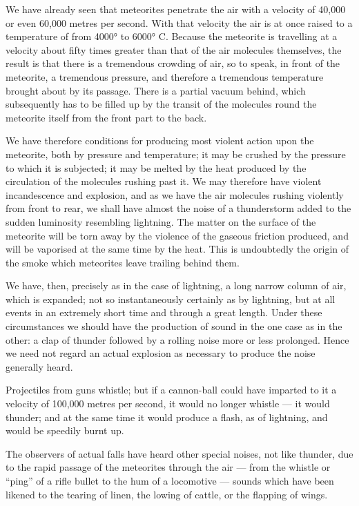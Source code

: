 \documentclass[a4paper, 12pt, oneside, polutonikogreek, english]{article}
\begin{document}
We have already seen that meteorites penetrate the air with a velocity of 40,000 or even 60,000 metres per second. With that velocity the air is at once raised to a temperature of from 4000° to 6000° C. Because the meteorite is travelling at a velocity about fifty times greater than that of the air molecules themselves, the result is that there is a tremendous crowding of air, so to speak, in front of the meteorite, a tremendous pressure, and therefore a tremendous temperature brought about by its passage. There is a partial vacuum behind, which subsequently has to be filled up by the transit of the molecules round the meteorite itself from the front part to the back.

We have therefore conditions for producing most violent action upon the meteorite, both by pressure and temperature; it may be crushed by the pressure to which it is subjected; it may be melted by the heat produced by the circulation of the molecules rushing past it. We may therefore have violent incandescence and explosion, and as we have the air molecules rushing violently from front to rear, we shall have almost the noise of a thunderstorm added to the sudden luminosity resembling lightning. The matter on the surface of the meteorite will be torn away by the violence of the gaseous friction produced, and will be vaporised at the same time by the heat. This is undoubtedly the origin of the smoke which meteorites leave trailing behind them.

We have, then, precisely as in the case of lightning, a long narrow column of air, which is expanded; not so instantaneously certainly as by lightning, but at all events in an extremely short time and through a great length. Under these circumstances we should have the production of sound in the one case as in the other: a clap of thunder followed by a rolling noise more or less prolonged. Hence we need not regard an actual explosion as necessary to produce the noise generally heard.

Projectiles from guns whistle; but if a cannon-ball could have imparted to it a velocity of 100,000 metres per second, it would no longer whistle --- it would thunder; and at the same time it would produce a flash, as of lightning, and would be speedily burnt up.

The observers of actual falls have heard other special noises, not like thunder, due to the rapid passage of the meteorites through the air --- from the whistle or ``ping'' of a rifle bullet to the hum of a locomotive --- sounds which have been likened to the tearing of linen, the lowing of cattle, or the flapping of wings.
\end{document}
